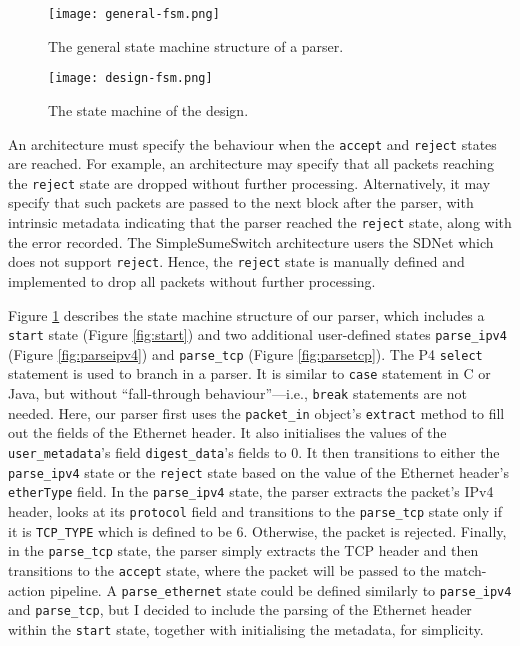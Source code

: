 \begin{figure}[!h]
	\begin{minipage}{.48\textwidth}
		\centering
		\texttt{[image: general-fsm.png]}
		\caption{The general state machine structure of a parser.}
		\label{fig:general-fsm}
	\end{minipage}
	\hfill
	\begin{minipage}{.48\textwidth}
		\centering
		\texttt{[image: design-fsm.png]}
		\caption{The state machine of the design.}
		\label{fig:design-fsm}
		\vspace{-2em}
	\end{minipage}
\end{figure}

An architecture must specify the behaviour when the \texttt{accept} and \texttt{reject} states are reached. For example, an architecture may specify that all packets reaching the \texttt{reject} state are dropped without further processing. Alternatively, it may specify that such packets are passed to the next block after the parser, with intrinsic metadata indicating that the parser reached the \texttt{reject} state, along with the error recorded. The SimpleSumeSwitch architecture users the SDNet which does not support \texttt{reject}. Hence, the \texttt{reject} state is manually defined and implemented to drop all packets without further processing.

Figure \ref{fig:design-fsm} describes the state machine structure of our parser, which includes a \texttt{start} state (Figure \ref{fig:start}) and two additional user-defined states \texttt{parse\_ipv4} (Figure \ref{fig:parseipv4}) and \texttt{parse\_tcp} (Figure \ref{fig:parsetcp}). The P4 \texttt{select} statement is used to branch in a parser. It is similar to \texttt{case} statement in C or Java, but without ``fall-through behaviour''---i.e., \texttt{break} statements are not needed. Here, our parser first uses the \verb|packet_in| object's \texttt{extract} method to fill out the fields of the Ethernet header. It also initialises the values of the \verb|user_metadata|'s field \verb|digest_data|'s fields to 0. It then transitions to either the \verb|parse_ipv4| state or the \texttt{reject} state based on the value of the Ethernet header’s \texttt{etherType} field. In the \texttt{parse\_ipv4} state, the parser extracts the packet's IPv4 header, looks at its \texttt{protocol} field and transitions to the \texttt{parse\_tcp} state only if it is \texttt{TCP\_TYPE} which is defined to be 6. Otherwise, the packet is rejected. Finally, in the \texttt{parse\_tcp} state, the parser simply extracts the TCP header and then transitions to the \texttt{accept} state, where the packet will be passed to the match-action pipeline. A \texttt{parse\_ethernet} state could be defined similarly to \verb|parse_ipv4| and \verb|parse_tcp|, but I decided to include the parsing of the Ethernet header within the \texttt{start} state, together with initialising the metadata, for simplicity.

